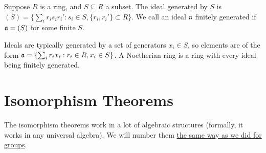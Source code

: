 \begin{definition}
    Suppose \(R\) is a ring, and \(S \subseteq R\) a subset.
    The ideal generated by \(S\) is
    \((S) = \{\sum_i r_i s_i r_i' : s_i \in S, \{r_i,r_i'\} \subset R\}\).
    We call an ideal \(\mathfrak{a}\) finitely generated
    if \(\mathfrak{a} = (S)\) for some finite \(S\).
\end{definition}
\begin{remark}
    Ideals are typically generated by a set of generators \(x_i \in S\),
    so elements are of the form
    \(\mathfrak{a} = \{\sum_i r_i x_i : r_i \in R, x_i \in S\}\).
    A Noetherian ring is a ring with every ideal being finitely generated.
\end{remark}


\section{Isomorphism Theorems}

\begin{remark}
    The isomorphism theorems work in a lot of algebraic structures
    (formally, it works in any universal algebra).
    We will number them \hyperref[rmk:iso-numbering]{the same way as we did for groups}.
\end{remark}

